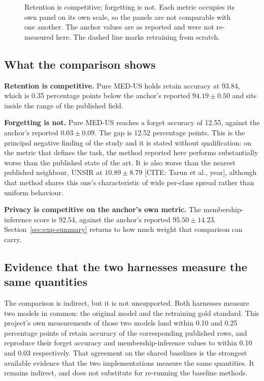 \begin{figure}[htbp]
  \centering
  \caption{Retention is competitive; forgetting is not. Each metric occupies its
  own panel on its own scale, so the panels are not comparable with one another.
  The anchor values are as reported and were not re-measured here. The dashed line
  marks retraining from scratch.}
  \label{fig:benchmark}
\end{figure}

\subsection{What the comparison shows}

\textbf{Retention is competitive.} Pure MED-US holds retain accuracy at 93.84,
which is 0.35 percentage points below the anchor's reported $94.19 \pm 0.50$ and
sits inside the range of the published field.

\textbf{Forgetting is not.} Pure MED-US reaches a forget accuracy of 12.55,
against the anchor's reported $0.03 \pm 0.09$. The gap is 12.52 percentage points.
This is the principal negative finding of the study and it is stated without
qualification: on the metric that defines the task, the method reported here
performs substantially worse than the published state of the art. It is also worse
than the nearest
published neighbour, UNSIR at $10.89 \pm 8.79$
[CITE: Tarun et al., year], although that method shares this one's characteristic
of wide per-class spread rather than uniform behaviour.

\textbf{Privacy is competitive on the anchor's own metric.} The
membership-inference score is 92.54, against the anchor's reported
$95.50 \pm 14.23$. Section~\ref{sec:exp-summary} returns to how much weight that
comparison can carry.

\subsection{Evidence that the two harnesses measure the same quantities}

The comparison is indirect, but it is not unsupported. Both harnesses measure two
models in common: the original model and the retraining gold standard. This
project's own measurements of those two models land within 0.10 and 0.25
percentage points of retain accuracy of the corresponding published rows, and
reproduce their forget accuracy and membership-inference values to within 0.10 and
0.03 respectively. That agreement on the shared baselines is the strongest
available evidence that the two implementations measure the same quantities. It
remains indirect, and does not substitute for re-running the baseline methods.


